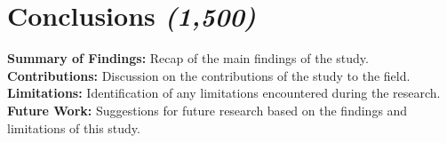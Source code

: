 \section{Conclusions \textit{(1,500)}}\label{section:Conclusions}
\textbf{Summary of Findings:} Recap of the main findings of the study.\newline
\textbf{Contributions:} Discussion on the contributions of the study to the field.\newline
\textbf{Limitations:} Identification of any limitations encountered during the research.\newline
\textbf{Future Work:} Suggestions for future research based on the findings and limitations of this study.\newline
